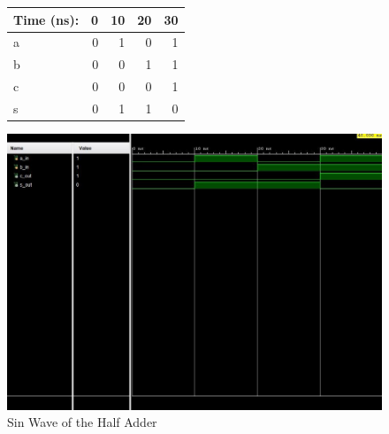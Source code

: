 \documentclass[11pt]{article}
\begin{document}
\begin{figure}[ht]\centering
	\begin{tabular}{l|rrrr}
		Time (ns): & 0 & 10 & 20 & 30 \\
		\midrule 
		a & 0 & 1 & 0 & 1 \\
		b & 0 & 0 & 1 & 1 \\
		\midrule
		c & 0 & 0 & 0 & 1 \\
		s & 0 & 1 & 1 & 0 \\ \bottomrule
	\end{tabular}\medskip
	
\end{figure}
\begin{figure}
	\includegraphics[width=1.0\textwidth]{"HalfAdder"}
	\caption{Sin Wave of the Half Adder}
\end{figure}
\clearpage
\end{document}
